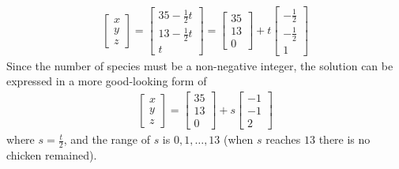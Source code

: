 \begin{Answer}
\begin{align*}
\begin{bmatrix}
x \\
y \\
z
\end{bmatrix}
=
\begin{bmatrix}
35-\frac{1}{2}t \\
13-\frac{1}{2}t \\
t
\end{bmatrix}
=
\begin{bmatrix}
35 \\
13 \\
0
\end{bmatrix}
+
t
\begin{bmatrix}
-\frac{1}{2} \\
-\frac{1}{2} \\
1
\end{bmatrix}
\end{align*}
Since the number of species must be a non-negative integer, the solution can be expressed in a more good-looking form of
\begin{align*}
\begin{bmatrix}
x \\
y \\
z
\end{bmatrix}
=
\begin{bmatrix}
35 \\
13 \\
0
\end{bmatrix}
+
s
\begin{bmatrix}
-1 \\
-1 \\
2
\end{bmatrix}
\end{align*}
where $s = \frac{t}{2}$, and the range of $s$ is $0, 1, \ldots, 13$ (when $s$ reaches $13$ there is no chicken remained).
\end{Answer}